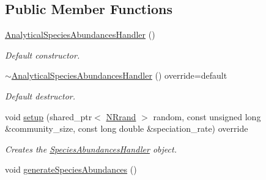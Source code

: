 \subsection*{Public Member Functions}
\begin{DoxyCompactItemize}
\item 
\hyperlink{class_analytical_species_abundances_handler_a6dd3df257df5b6a53e268ee68169d2e1}{Analytical\+Species\+Abundances\+Handler} ()\hypertarget{class_analytical_species_abundances_handler_a6dd3df257df5b6a53e268ee68169d2e1}{}\label{class_analytical_species_abundances_handler_a6dd3df257df5b6a53e268ee68169d2e1}

\begin{DoxyCompactList}\small\item\em Default constructor. \end{DoxyCompactList}\item 
\hyperlink{class_analytical_species_abundances_handler_a5653844a38727d2f493c7f1fbfd2cde1}{$\sim$\+Analytical\+Species\+Abundances\+Handler} () override=default\hypertarget{class_analytical_species_abundances_handler_a5653844a38727d2f493c7f1fbfd2cde1}{}\label{class_analytical_species_abundances_handler_a5653844a38727d2f493c7f1fbfd2cde1}

\begin{DoxyCompactList}\small\item\em Default destructor. \end{DoxyCompactList}\item 
void \hyperlink{class_analytical_species_abundances_handler_a4ee4ee4778d5544f293b433528e070e1}{setup} (shared\+\_\+ptr$<$ \hyperlink{class_n_rrand}{N\+Rrand} $>$ random, const unsigned long \&community\+\_\+size, const long double \&speciation\+\_\+rate) override
\begin{DoxyCompactList}\small\item\em Creates the \hyperlink{class_species_abundances_handler}{Species\+Abundances\+Handler} object. \end{DoxyCompactList}\item 
void \hyperlink{class_analytical_species_abundances_handler_ad681c92bc8f8c3c06b0ca1193bde2a18}{generate\+Species\+Abundances} ()\hypertarget{class_analytical_species_abundances_handler_ad681c92bc8f8c3c06b0ca1193bde2a18}{}\label{class_analytical_species_abundances_handler_ad681c92bc8f8c3c06b0ca1193bde2a18}


\end{DoxyCompactItemize}

